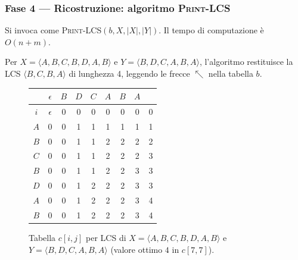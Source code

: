 \subsubsection{Fase 4 — Ricostruzione: algoritmo \textsc{Print-LCS}}

\begin{algorithm}[H]
\caption{\textsc{Print-LCS}$(b, X, i, j)$}


\end{algorithm}

Si invoca come \textsc{Print-LCS}$(b, X, |X|, |Y|)$. Il tempo di computazione è
$O(n + m)$.

\begin{esempio}
Per $X = \langle A,B,C,B,D,A,B \rangle$ e $Y = \langle B,D,C,A,B,A \rangle$,
l'algoritmo restituisce la LCS $\langle B, C, B, A \rangle$ di lunghezza 4,
leggendo le frecce $\nwarrow$ nella tabella $b$.
\end{esempio}

\begin{figure}[H]
	\centering
	\renewcommand{\arraystretch}{1.1}
	\setlength{\tabcolsep}{3pt}
	\begin{tabular}{c|cccccccc}
		\toprule
		 & $\epsilon$ & $B$ & $D$ & $C$ & $A$ & $B$ & $A$ \\
		\midrule
		$i$ & $\epsilon$ & 0 & 0 & 0 & 0 & 0 & 0 & 0 \\
		$A$ & 0 & 0 & 1 & 1 & 1 & 1 & 1 & 1 \\
		$B$ & 0 & 0 & 1 & 1 & 2 & 2 & 2 & 2 \\
		$C$ & 0 & 0 & 1 & 1 & 2 & 2 & 2 & 3 \\
		$B$ & 0 & 0 & 1 & 1 & 2 & 2 & 3 & 3 \\
		$D$ & 0 & 0 & 1 & 2 & 2 & 2 & 3 & 3 \\
		$A$ & 0 & 0 & 1 & 2 & 2 & 2 & 3 & \cellcolor{cyan!15}4 \\
		$B$ & 0 & 0 & 1 & 2 & 2 & 2 & 3 & 4 \\
		\bottomrule
	\end{tabular}
	\caption{Tabella $c[i,j]$ per LCS di $X=\langle A,B,C,B,D,A,B\rangle$ e $Y=\langle B,D,C,A,B,A\rangle$ (valore ottimo $4$ in $c[7,7]$).}
\end{figure}


